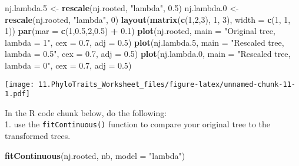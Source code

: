 \documentclass[]{article}
\newenvironment{Shaded}{\begin{snugshade}}{\end{snugshade}}
\newcommand{\KeywordTok}[1]{\textcolor[rgb]{0.13,0.29,0.53}{\textbf{#1}}}
\newcommand{\DataTypeTok}[1]{\textcolor[rgb]{0.13,0.29,0.53}{#1}}
\newcommand{\DecValTok}[1]{\textcolor[rgb]{0.00,0.00,0.81}{#1}}
\newcommand{\FloatTok}[1]{\textcolor[rgb]{0.00,0.00,0.81}{#1}}
\newcommand{\StringTok}[1]{\textcolor[rgb]{0.31,0.60,0.02}{#1}}
\newcommand{\OperatorTok}[1]{\textcolor[rgb]{0.81,0.36,0.00}{\textbf{#1}}}
\newcommand{\NormalTok}[1]{#1}
\begin{document}
\begin{Shaded}
\begin{Highlighting}[]
\NormalTok{nj.lambda.}\DecValTok{5}\NormalTok{ <-}\StringTok{ }\KeywordTok{rescale}\NormalTok{(nj.rooted, }\StringTok{"lambda"}\NormalTok{, }\FloatTok{0.5}\NormalTok{)}
\NormalTok{nj.lambda.}\DecValTok{0}\NormalTok{ <-}\StringTok{ }\KeywordTok{rescale}\NormalTok{(nj.rooted, }\StringTok{"lambda"}\NormalTok{, }\DecValTok{0}\NormalTok{)}
\KeywordTok{layout}\NormalTok{(}\KeywordTok{matrix}\NormalTok{(}\KeywordTok{c}\NormalTok{(}\DecValTok{1}\NormalTok{,}\DecValTok{2}\NormalTok{,}\DecValTok{3}\NormalTok{), }\DecValTok{1}\NormalTok{, }\DecValTok{3}\NormalTok{), }\DataTypeTok{width =} \KeywordTok{c}\NormalTok{(}\DecValTok{1}\NormalTok{, }\DecValTok{1}\NormalTok{, }\DecValTok{1}\NormalTok{))}
\KeywordTok{par}\NormalTok{(}\DataTypeTok{mar =} \KeywordTok{c}\NormalTok{(}\DecValTok{1}\NormalTok{,}\FloatTok{0.5}\NormalTok{,}\DecValTok{2}\NormalTok{,}\FloatTok{0.5}\NormalTok{) }\OperatorTok{+}\StringTok{ }\FloatTok{0.1}\NormalTok{)}
\KeywordTok{plot}\NormalTok{(nj.rooted, }\DataTypeTok{main =} \StringTok{"Original tree, lambda = 1"}\NormalTok{, }\DataTypeTok{cex =} \FloatTok{0.7}\NormalTok{, }\DataTypeTok{adj =} \FloatTok{0.5}\NormalTok{)}
\KeywordTok{plot}\NormalTok{(nj.lambda.}\DecValTok{5}\NormalTok{, }\DataTypeTok{main =} \StringTok{"Rescaled tree, lambda = 0.5"}\NormalTok{, }\DataTypeTok{cex =} \FloatTok{0.7}\NormalTok{, }\DataTypeTok{adj =} \FloatTok{0.5}\NormalTok{)}
\KeywordTok{plot}\NormalTok{(nj.lambda.}\DecValTok{0}\NormalTok{, }\DataTypeTok{main =} \StringTok{"Rescaled tree, lambda = 0"}\NormalTok{, }\DataTypeTok{cex =} \FloatTok{0.7}\NormalTok{, }\DataTypeTok{adj =} \FloatTok{0.5}\NormalTok{)}
\end{Highlighting}
\end{Shaded}

\texttt{[image: 11.PhyloTraits\_Worksheet\_files/figure-latex/unnamed-chunk-11-1.pdf]}

In the R code chunk below, do the following:\\
1. use the \texttt{fitContinuous()} function to compare your original
tree to the transformed trees.

\begin{Shaded}
\begin{Highlighting}[]
\KeywordTok{fitContinuous}\NormalTok{(nj.rooted, nb, }\DataTypeTok{model =} \StringTok{"lambda"}\NormalTok{)}
\end{Highlighting}
\end{Shaded}
\end{document}
